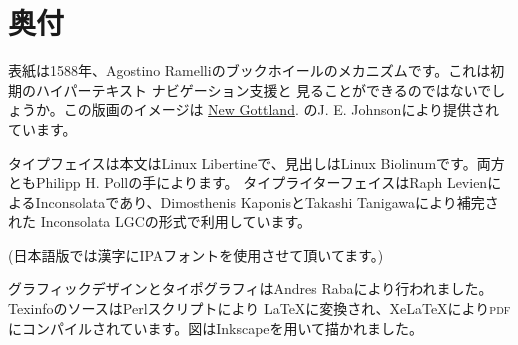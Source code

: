 \documentclass[oneside]{book}
\newcommand{\acronym}[1]{\textsc{\MakeLowercase{#1}}}
\begin{document}
% 




\printindex

\chapter*{奥付}
\label{Colophon}

表紙は1588年、Agostino Ramelliのブックホイールのメカニズムです。これは初期のハイパーテキスト ナビゲーション支援と
見ることができるのではないでしょうか。この版画のイメージは
\href{http://newgottland.com/2012/02/09/before-the-ereader-there-was-the-wheelreader/ramelli_bookwheel_1032px/}{New Gottland}. 
のJ. E. Johnsonにより提供されています。

タイプフェイスは本文はLinux Libertineで、見出しはLinux Biolinumです。両方ともPhilipp H. Pollの手によります。
タイプライターフェイスはRaph LevienによるInconsolataであり、Dimosthenis KaponisとTakashi Tanigawaにより補完された
Inconsolata LGCの形式で利用しています。

(日本語版では漢字にIPAフォントを使用させて頂いてます。)

グラフィックデザインとタイポグラフィはAndres Rabaにより行われました。TexinfoのソースはPerlスクリプトにより
LaTeXに変換され、XeLaTeXにより\acronym{PDF}にコンパイルされています。図はInkscapeを用いて描かれました。
\end{document}
